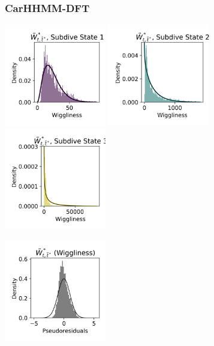 \documentclass{article}
\begin{document}
        \subsubsection{CarHHMM-DFT}
        
        \begin{center}
        \includegraphics[width=1.75in]{../Plots/CarHHMM2_empirical_hist_ahat_0.png}
        \includegraphics[width=1.75in]{../Plots/CarHHMM2_empirical_hist_ahat_1.png}
        \includegraphics[width=1.75in]{../Plots/CarHHMM2_empirical_hist_ahat_2.png}
        
        \includegraphics[width=1.75in]{../Plots/CarHHMM2_psedoresids_ahat.png}
        \end{center}
        
\end{document}
